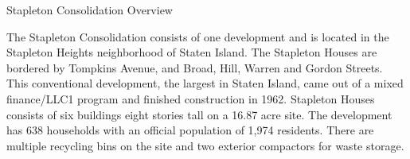 Stapleton Consolidation Overview

The Stapleton Consolidation consists of one development and is located in the Stapleton Heights neighborhood of Staten Island. The Stapleton Houses are bordered by Tompkins Avenue, and Broad, Hill, Warren and Gordon Streets. This conventional development, the largest in Staten Island, came out of a mixed finance/LLC1 program and finished construction in 1962. Stapleton Houses consists of six buildings eight stories tall on a 16.87 acre site. The development has 638 households with an official population of 1,974 residents. There are multiple recycling bins on the site and two exterior compactors for waste storage.